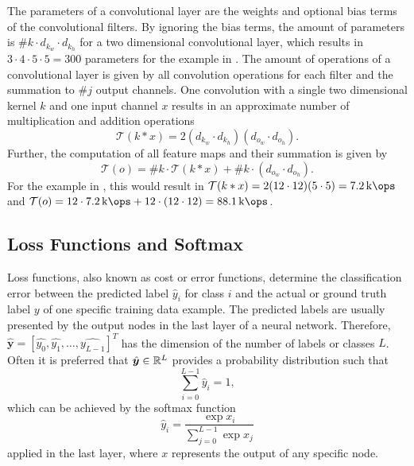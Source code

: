 The parameters of a convolutional layer are the weights and optional bias terms of the convolutional filters.
By ignoring the bias terms, the amount of parameters is $\#k \cdot d_{k_w} \cdot d_{k_h}$ for a two dimensional convolutional layer, which results in $3 \cdot 4 \cdot 5 \cdot 5 = 300$ parameters for the example in .
The amount of operations of a convolutional layer is given by all convolution operations for each filter and the summation to $\#j$ output channels.
One convolution with a single two dimensional kernel $k$ and one input channel $x$ results in an approximate number of multiplication and addition operations
\begin{equation}
  \mathcal{T}(k * x) = 2(d_{k_w} \cdot d_{k_h}) (d_{o_w} \cdot d_{o_h}).
\end{equation}
Further, the computation of all feature maps and their summation is given by
\begin{equation}
  \mathcal{T}(o) = \#k \cdot \mathcal{T}(k * x) + \#k \cdot (d_{o_w} \cdot d_{o_h}).
\end{equation}
For the example in , this would result in $\mathcal{T}(k * x) = 2 (12 \cdot 12) (5 \cdot 5) = \SI{7.2}{\kilo\ops}$ and $\mathcal{T}(o) = 12 \cdot \SI{7.2}{\kilo\ops} + 12 \cdot (12 \cdot 12) = \SI{88.1}{\kilo\ops}$.



\subsection{Loss Functions and Softmax}
Loss functions, also known as cost or error functions, determine the classification error between the predicted label $\hat{y}_i$ for class $i$ and the actual or ground truth label $y$ of one specific training data example.
The predicted labels are usually presented by the output nodes in the last layer of a neural network.
Therefore, $\hat{\bm{y}} = [\hat{y_0}, \hat{y_1}, \dots, \hat{y_{L-1}}]^T$ has the dimension of the number of labels or classes $L$.
Often it is preferred that $\hat{\bm{y}} \in \mathbb{R}^L$ provides a probability distribution such that
\begin{equation}
  \sum_{i=0}^{L-1} \hat{y}_i = 1,
\end{equation}
which can be achieved by the softmax function
\begin{equation}\label{eq:nn_theory_softmax}
  \hat{y}_i = \frac{\exp{x_i}}{\sum_{j=0}^{L-1}\exp{x_j}}
\end{equation}
applied in the last layer, where $x$ represents the output of any specific node.

